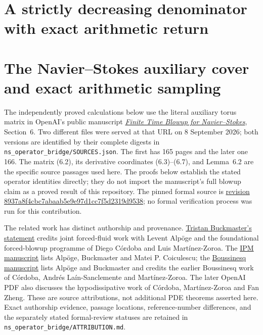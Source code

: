 \documentclass[11pt]{article}
\theoremstyle{definition}\newtheorem{definition}[theorem]{Definition}
\theoremstyle{remark}\newtheorem{remark}[theorem]{Remark}
\begin{document}
\section{A strictly decreasing denominator with exact arithmetic return}


\section{The Navier--Stokes auxiliary cover and exact arithmetic sampling}

The independently proved calculations below use the literal auxiliary
torus matrix in OpenAI's public manuscript
\href{https://cdn.openai.com/pdf/32d9f210-8b73-45e0-91bc-82a30aef8a9a/navier-stokes.pdf}
{\emph{Finite Time Blowup for Navier--Stokes}}, Section~6.
Two different files were served at that URL on 8 September 2026;
both versions are identified by their complete digests in
\texttt{ns\_operator\_bridge/SOURCES.json}. The first has 165 pages
and the later one 166. The matrix (6.2), its derivative coordinates
(6.3)--(6.7), and Lemma~6.2 are the specific source passages used
here. The proofs below establish the stated operator identities
directly; they do not import the manuscript's full blowup claim as a
proved result of this repository. The pinned formal source is
\href{https://github.com/openai/NavierStokesAndEuler/tree/8937a8f4cbc7abaab5e9e97d1cc7f5d2319d9538}
{revision 8937a8f4cbc7abaab5e9e97d1cc7f5d2319d9538}; no formal
verification process was run for this contribution.

The related work has distinct authorship and provenance.
\href{https://cims.nyu.edu/~tristanb/statement.pdf}{Tristan Buckmaster's statement}
credits joint forced-fluid work with Levent Alp\"oge and the
foundational forced-blowup programme of Diego C\'ordoba and
Luis Mart\'inez-Zoroa. The
\href{https://cims.nyu.edu/~tristanb/ipm.pdf}{IPM manuscript}
lists Alp\"oge, Buckmaster and Matei P. Coiculescu; the
\href{https://cims.nyu.edu/~tristanb/boussinesq.pdf}{Boussinesq manuscript}
lists Alp\"oge and Buckmaster and credits the earlier Boussinesq
work of C\'ordoba, Andr\'es La\'in-Sanclemente and Mart\'inez-Zoroa.
The later OpenAI PDF also discusses the hypodissipative work of
C\'ordoba, Mart\'inez-Zoroa and Fan Zheng. These are source
attributions, not additional PDE theorems asserted here. Exact
authorship evidence, passage locations, reference-number differences,
and the separately stated formal-review statuses are retained in
\texttt{ns\_operator\_bridge/ATTRIBUTION.md}.





\end{document}

